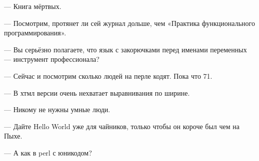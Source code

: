 \documentclass[14pt]{beamer}
\begin{document}
\begin{frame}
    \begin{center}
        --- Книга мёртвых.
    \end{center}
\end{frame}

\begin{frame}
    \begin{center}
        --- Посмотрим, протянет ли сей журнал дольше, чем «Практика
        функционального программирования».
    \end{center}
\end{frame}

\begin{frame}
    \begin{center}
        --- Вы серьёзно полагаете, что язык с закорючками перед именами
        переменных — инструмент профессионала?
    \end{center}
\end{frame}

\begin{frame}
    \begin{center}
        --- Сейчас и посмотрим сколько людей на перле кодят. Пока что 71.
    \end{center}
\end{frame}

\begin{frame}
    \begin{center}
        --- В хтмл версии очень нехватает выравнивания по ширине.
    \end{center}
\end{frame}

\begin{frame}
    \begin{center}
        --- Никому не нужны умные люди.
    \end{center}
\end{frame}

\begin{frame}
    \begin{center}
        --- Дайте Hello World уже для чайников, только чтобы он короче был чем
        на Пыхе.
    \end{center}
\end{frame}

\begin{frame}
    \begin{center}
        --- А как в perl с юникодом?
    \end{center}
\end{frame}
\end{document}
